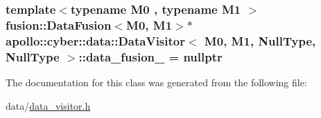 \hypertarget{classapollo_1_1cyber_1_1data_1_1DataVisitor_3_01M0_00_01M1_00_01NullType_00_01NullType_01_4_a78ad754826bf212cdac717346331dfb2}{
\subsubsection[{data\-\_\-fusion\-\_\-}]{\setlength{\rightskip}{0pt plus 5cm}template$<$typename M0 , typename M1 $>$ {\bf fusion\-::\-Data\-Fusion}$<$M0, M1$>$$\ast$ {\bf apollo\-::cyber\-::data\-::\-Data\-Visitor}$<$ M0, M1, {\bf Null\-Type}, {\bf Null\-Type} $>$\-::data\-\_\-fusion\-\_\- = nullptr\hspace{0.3cm}{\ttfamily [private]}}}\label{classapollo_1_1cyber_1_1data_1_1DataVisitor_3_01M0_00_01M1_00_01NullType_00_01NullType_01_4_a78ad754826bf212cdac717346331dfb2}


The documentation for this class was generated from the following file\-:\begin{DoxyCompactItemize}
\item 
data/\hyperlink{data__visitor_8h}{data\-\_\-visitor.\-h}\end{DoxyCompactItemize}

